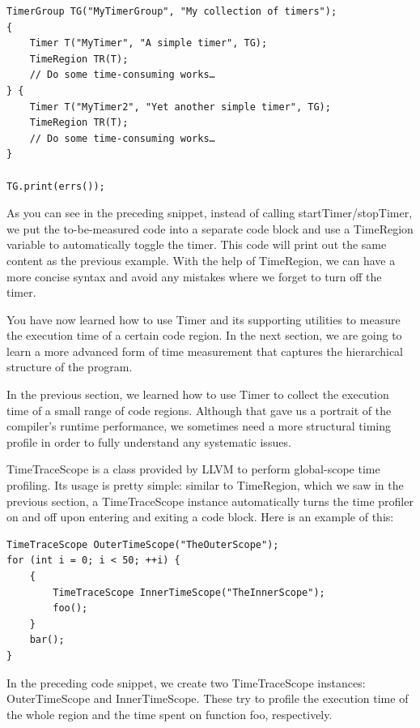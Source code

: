 \begin{lstlisting}[style=styleCXX]
TimerGroup TG("MyTimerGroup", "My collection of timers");
{
	Timer T("MyTimer", "A simple timer", TG);
	TimeRegion TR(T);
	// Do some time-consuming works…
} {
	Timer T("MyTimer2", "Yet another simple timer", TG);
	TimeRegion TR(T);
	// Do some time-consuming works…
}

TG.print(errs());
\end{lstlisting}


As you can see in the preceding snippet, instead of calling startTimer/stopTimer, we put the to-be-measured code into a separate code block and use a TimeRegion variable to automatically toggle the timer. This code will print out the same content as the previous example. With the help of TimeRegion, we can have a more concise syntax and avoid any mistakes where we forget to turn off the timer.

You have now learned how to use Timer and its supporting utilities to measure the execution time of a certain code region. In the next section, we are going to learn a more advanced form of time measurement that captures the hierarchical structure of the program.



In the previous section, we learned how to use Timer to collect the execution time of a small range of code regions. Although that gave us a portrait of the compiler's runtime performance, we sometimes need a more structural timing profile in order to fully understand any systematic issues.

TimeTraceScope is a class provided by LLVM to perform global-scope time profiling. Its usage is pretty simple: similar to TimeRegion, which we saw in the previous section, a TimeTraceScope instance automatically turns the time profiler on and off upon entering and exiting a code block. Here is an example of this:

\begin{lstlisting}[style=styleCXX]
TimeTraceScope OuterTimeScope("TheOuterScope");
for (int i = 0; i < 50; ++i) {
	{
		TimeTraceScope InnerTimeScope("TheInnerScope");
		foo();
	}
	bar();
}
\end{lstlisting}

In the preceding code snippet, we create two TimeTraceScope instances: OuterTimeScope and InnerTimeScope. These try to profile the execution time of the whole region and the time spent on function foo, respectively.

